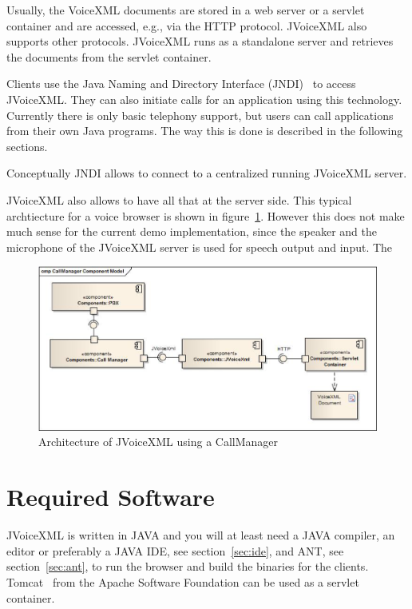 \documentclass[11pt,a4paper]{article}
\begin{document}
Usually, the VoiceXML documents are stored in a web server or a servlet
container and are accessed, e.g., via the HTTP protocol. JVoiceXML also
supports other protocols. JVoiceXML runs as a standalone server and retrieves
the documents from the servlet container. 

Clients use the Java Naming and Directory Interface (JNDI)~\cite{sun:jndi} to 
access JVoiceXML. They can also initiate calls for an application using this 
technology. Currently there is only basic telephony support, but users can call 
applications from their own Java programs. The way this is done is described in
the following sections.

Conceptually JNDI allows to connect to a centralized running JVoice\-XML 
server.

JVoiceXML also allows to have all that at the server side.
This typical archtiecture for a voice browser is shown in
figure~\ref{fig:server-architecture}. However this does not make much sense for
the current demo implementation, since the speaker and the microphone of the
JVoiceXML server is used for speech output and input. The
\begin{figure}
\includegraphics[width=\linewidth]{server-architecture.eps}
\caption{Architecture of JVoiceXML using a CallManager}
\label{fig:server-architecture}
\end{figure}


\section{Required Software}
\label{sec:required-software}

JVoiceXML is written in JAVA and you will at least need a JAVA compiler, an 
editor or preferably a JAVA IDE, see section~\ref{sec:ide}, and ANT, see 
section~\ref{sec:ant}, to run the browser and build the binaries for the 
clients. Tomcat~\cite{apache:tomcat} from the Apache Software Foundation can be
used as a servlet container.
\end{document}
